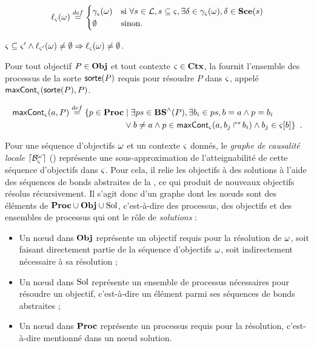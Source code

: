 \begin{definition}[$\uconcr : \OS \to \powerset(\Sce)$]
  \[ \ell_\varsigma(\omega) \stackrel{def}=
    \begin{cases}
      \gamma_\varsigma(\omega) & \text{si } \forall s \in \mathcal{L}, s \subseteq \varsigma, \exists \delta \in \gamma_\varsigma(\omega),
        \delta \in \mathbf{Sce}(s) \\
      \emptyset & \text{sinon.}
    \end{cases} \]
\end{definition}

\begin{lemma}
  $\varsigma \subseteq \varsigma' \wedge \ell_{\varsigma'}(\omega) \neq \emptyset \Rightarrow
    \ell_{\varsigma}(\omega) \neq \emptyset$.
\end{lemma}

Pour tout objectif $P \in \mathbf{Obj}$ et tout contexte $\varsigma \in \mathbf{Ctx}$, la 
fournit l'ensemble des processus de la sorte $\mathsf{sorte}(P)$ requis pour résoudre $P$ dans $\varsigma$,
appelé $\mathsf{maxCont}_\varsigma(\mathsf{sorte}(P), P)$.
\begin{definition}[$\gCont_\ctx : \Sigma \times \Obj \to \powerset(\PHproc)$]
  \begin{align*}
    \mathsf{maxCont}_\varsigma(a,P) \stackrel{def}=
    \{ p \in \mathbf{Proc} &\mid \exists ps \in \mathbf{BS}^\wedge(P), \exists b_i \in ps, b = a \wedge p = b_i \\
      & \vee b \neq a \wedge p \in \mathsf{maxCont}_\varsigma(a, \mbox{$b_j\Rsh^*\!b_i$}) \wedge b_j \in {\varsigma[b]} \}
    \enspace.
  \end{align*}
\end{definition}

Pour une séquence d'objectifs $\omega$ et un contexte $\varsigma$ donnés,
le \emph{graphe de causalité locale} $\lceil \mathcal{B}_\varsigma^\omega\rceil$ () représente une sous-approximation de
l'atteignabilité de cette séquence d'objectifs dans $\varsigma$.
Pour cela, il relie les objectifs à des solutions à
l'aide des séquences de bonds abstraites de la , ce qui produit de nouveaux objectifs
résolus récursivement.
Il s'agit donc d'un graphe dont les nœuds sont des éléments de $\mathbf{Proc} \cup \mathbf{Obj} \cup \mathrm{Sol}$,
c'est-à-dire des processus, des objectifs et des ensembles de processus qui ont le rôle
de \emph{solutions} :
\begin{itemize}
  \item Un nœud dans $\mathbf{Obj}$ représente un objectif requis pour la résolution de $\omega$,
    soit faisant directement partie de la séquence d'objectifs $\omega$,
    soit indirectement nécessaire à sa résolution ;
  \item Un nœud dans $\mathrm{Sol}$ représente un ensemble de processus nécessaires pour résoudre
    un objectif, c'est-à-dire un élément parmi ses séquences de bonds abstraites ;
  \item Un nœud dans $\mathbf{Proc}$ représente un processus requis pour la résolution,
    c'est-à-dire mentionné dans un nœud solution.
\end{itemize}

